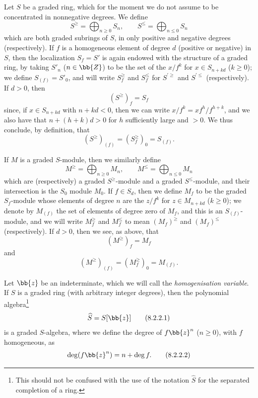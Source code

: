 \begin{env}[8.2.1]
\label{II.8.2.1}
Let $S$ be a graded ring, which for the moment we do not assume to be concentrated in nonnegative degrees.
We define
\[
\label{II.8.2.1.1}
  S^\geq = \bigoplus_{n\geq0} S_n,
  \qquad
  S^\leq = \bigoplus_{n\leq0} S_n
\tag{8.2.1.1}
\]
which are both graded subrings of $S$, in only positive and negative degrees (respectively).
If $f$ is a homogeneous element of degree $d$ (positive or negative) in $S$, then the localization $S_f=S'$ is again endowed with the structure of a graded ring, by taking $S'_n$ ($n\in\bb{Z}$) to be the set of the $x/f^k$ for $x\in S_{n+kd}$ ($k\geq0$);
we define $S_{(f)}=S'_0$, and will write $S_f^\geq$ and $S_f^\leq$ for $S^{'\geq}$ and $S^{'\leq}$ (respectively).
If $d>0$, then
\[
\label{II.8.2.1.2}
  (S^\geq)_f = S_f
\tag{8.2.1.2}
\]
since, if $x\in S_{n+kd}$ with $n+kd<0$, then we can write $x/f^k = xf^h/f^{h+k}$, and we also have that $n+(h+k)d>0$ for $h$ sufficiently large and $>0$.
We thus conclude, by definition, that
\[
\label{II.8.2.1.3}
  (S^\geq)_{(f)} = (S_f^\geq)_0 = S_{(f)}.
\tag{8.2.1.3}
\]

If $M$ is a graded $S$-module, then we similarly define
\[
\label{II.8.2.1.4}
  M^\geq = \bigoplus_{n\geq0} M_n,
  \qquad
  M^\leq = \bigoplus_{n\leq0} M_n
\tag{8.2.1.4}
\]
which are (respectively) a graded $S^\geq$-module and a graded $S^\leq$-module, and their intersection is the $S_0$ module $M_0$.
If $f\in S_d$, then we define $M_f$ to be the graded $S_f$-module whose elements of degree $n$ are the $z/f^k$ for $z\in M_{n+kd}$ ($k\geq0$);
we denote by $M_{(f)}$ the set of elements of degree zero of $M_f$, and this is an $S_{(f)}$-module, and we will write $M_f^\geq$ and $M_f^\leq$ to mean $(M_f)^\geq$ and $(M_f)^\leq$ (respectively).
If $d>0$, then we see, as above, that
\[
\label{II.8.2.1.5}
  (M^\geq)_f = M_f
\tag{8.2.1.5}
\]
and
\[
\label{II.8.2.1.6}
  (M^\geq)_{(f)} = (M_f^\geq)_0 = M_{(f)}.
\tag{8.2.1.6}
\]
\end{env}

\begin{env}[8.2.2]
\label{II.8.2.2}
Let $\bb{z}$ be an indeterminate, which we will call the \emph{homogenisation variable}.
If $S$ is a graded ring (with arbitrary integer degrees), then the polynomial algebra\footnote{This should not be confused with the use of the notation $\widehat{S}$ for the separated completion of a ring.}
\[
\label{II.8.2.2.1}
  \widehat{S} = S[\bb{z}]
\tag{8.2.2.1}
\]
is a graded $S$-algebra, where we define the degree of $f\bb{z}^n$ ($n\geq0$), with $f$ homogeneous, as
\[
\label{II.8.2.2.2}
  \deg(f\bb{z}^n) = n+\deg f.
\tag{8.2.2.2}
\]
\end{env}

